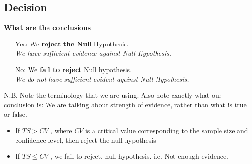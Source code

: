 \documentclass[a4paper,12pt]{article}
\begin{document}
\newpage 
\subsection*{Decision}



\begin{framed}
\noindent \textbf{What are the conclusions}
	\begin{itemize} 
		
		\item[Yes:] We \textbf{reject the Null} Hypothesis. \\ \textit{We have sufficient evidence against Null Hypothesis.}
		
		\item[No:] We \textbf{fail to reject} Null hypothesis. \\ \textit{We do not have sufficient evident against Null Hypothesis.}
	\end{itemize}	
	{	\normalsize
		N.B. Note the terminology that we are using. Also note exactly what our conclusion is: We are talking about strength of evidence, rather than what is true or false.}
	
\end{framed}
\begin{itemize}
	\item 	If $TS > CV$ , where $CV$ is a critical value corresponding to the sample size and confidence level, then reject the null hypothesis. 
	\item  If $TS \leq CV$ , we fail to reject. null hypothesis. i.e. Not enough evidence. 
	\end{itemize}	
	
	\smallskip
	
	
	
\end{document}
